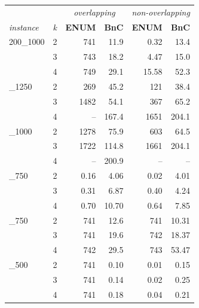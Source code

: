 \documentclass[conference]{IEEEtran}
\begin{document}
\begin{table}
\centering
\captionsetup{font=small}
\label{table:runtime}

\begin{tabular}{|ll|rr|rr|}
\hline
		 &   &  \multicolumn{2}{|c|}{\emph{overlapping}} & \multicolumn{2}{|c|}{\emph{non-overlapping}} \\
         \cline{3-6}
\emph{instance} & \emph{k} &  \textbf{ENUM} &  \textbf{BnC} &  \textbf{ENUM} &  \textbf{BnC} \\
\hline         
200\_1000 & 2 &     741 &    11.9 &       0.32 &    13.4 \\
         & 3 &     743 &    18.2 &       4.47 &    15.0 \\
         & 4 &     749 &    29.1 &      15.58 &    52.3 \\
\hdashline[.4pt/1pt]         
200\_1250 & 2 &     269 &    45.2 &     121 &    38.4 \\
         & 3 &    1482 &    54.1 &     367 &    65.2 \\
         & 4 &        -- &   167.4 &    1651 &   204.1 \\
\hdashline[.4pt/1pt]         
250\_1000 & 2 &    1278 &    75.9 &     603 &    64.5 \\
         & 3 &    1722 &   114.8 &    1661 &   204.1 \\
         & 4 &        -- &   200.9 &         --  &       --  \\
\hdashline[.4pt/1pt]         
250\_750 & 2 &       0.16 &     4.06 &       0.02 &     4.01 \\
         & 3 &       0.31 &     6.87 &       0.40 &     4.24 \\
         & 4 &       0.70 &    10.70 &       0.64 &     7.85 \\
\hdashline[.4pt/1pt]         
300\_750 & 2 &     741 &    12.6 &     741 &    10.31 \\
         & 3 &     741 &    19.6 &     742 &    18.37 \\
         & 4 &     742 &    29.5 &     743 &    53.47 \\
\hdashline[.4pt/1pt]         
350\_500 & 2 &     741 &     0.10 &       0.01 &     0.15 \\
         & 3 &     741 &     0.14 &       0.02 &     0.25 \\
         & 4 &     741 &     0.18 &       0.04 &     0.21 \\

\end{tabular}
\end{table}
\end{document}
